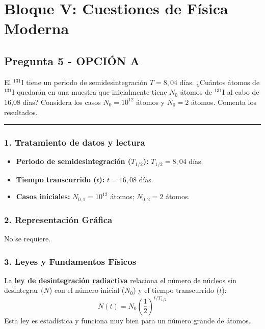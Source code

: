 \newpage

\section{Bloque V: Cuestiones de Física Moderna}
\label{sec:moderna_2003_sep_ext}

\subsection{Pregunta 5 - OPCIÓN A}
\label{subsec:5A_2003_sep_ext}

\begin{cajaenunciado}
El ${}^{131}\text{I}$ tiene un periodo de semidesintegración $T=8,04$ días. ¿Cuántos átomos de ${}^{131}\text{I}$ quedarán en una muestra que inicialmente tiene $N_0$ átomos de ${}^{131}\text{I}$ al cabo de 16,08 días? Considera los casos $N_0=10^{12}$ átomos y $N_0=2$ átomos. Comenta los resultados.
\end{cajaenunciado}
\hrule

\subsubsection*{1. Tratamiento de datos y lectura}
\begin{itemize}
    \item \textbf{Periodo de semidesintegración ($T_{1/2}$):} $T_{1/2} = 8,04$ días.
    \item \textbf{Tiempo transcurrido ($t$):} $t = 16,08$ días.
    \item \textbf{Casos iniciales:} $N_{0,1} = 10^{12}$ átomos; $N_{0,2} = 2$ átomos.
\end{itemize}

\subsubsection*{2. Representación Gráfica}
No se requiere.

\subsubsection*{3. Leyes y Fundamentos Físicos}
La \textbf{ley de desintegración radiactiva} relaciona el número de núcleos sin desintegrar ($N$) con el número inicial ($N_0$) y el tiempo transcurrido ($t$):
$$N(t) = N_0 \left(\frac{1}{2}\right)^{t/T_{1/2}}$$
Esta ley es estadística y funciona muy bien para un número grande de átomos.

